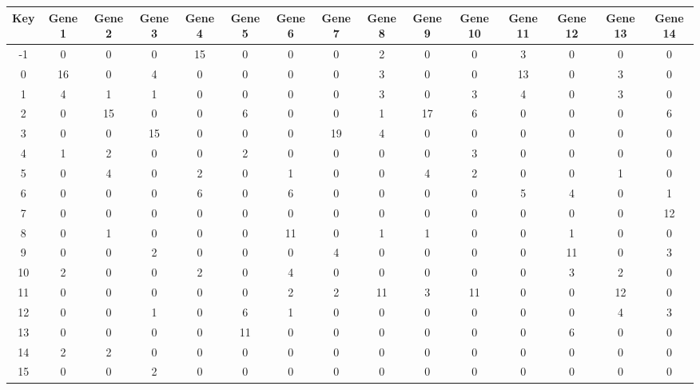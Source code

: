 \begin{tabular}{|c|c|c|c|c|c|c|c|c|c|c|c|c|c|c|}
\hline
Key & Gene 1 & Gene 2 & Gene 3 & Gene 4 & Gene 5 & Gene 6 & Gene 7 & Gene 8 & Gene 9 & Gene 10 & Gene 11 & Gene 12 & Gene 13 & Gene 14 \\
\hline
-1 & 0 & 0 & 0 & 15 & 0 & 0 & 0 & 2 & 0 & 0 & 3 & 0 & 0 & 0 \\
0 & 16 & 0 & 4 & 0 & 0 & 0 & 0 & 3 & 0 & 0 & 13 & 0 & 3 & 0 \\
1 & 4 & 1 & 1 & 0 & 0 & 0 & 0 & 3 & 0 & 3 & 4 & 0 & 3 & 0 \\
2 & 0 & 15 & 0 & 0 & 6 & 0 & 0 & 1 & 17 & 6 & 0 & 0 & 0 & 6 \\
3 & 0 & 0 & 15 & 0 & 0 & 0 & 19 & 4 & 0 & 0 & 0 & 0 & 0 & 0 \\
4 & 1 & 2 & 0 & 0 & 2 & 0 & 0 & 0 & 0 & 3 & 0 & 0 & 0 & 0 \\
5 & 0 & 4 & 0 & 2 & 0 & 1 & 0 & 0 & 4 & 2 & 0 & 0 & 1 & 0 \\
6 & 0 & 0 & 0 & 6 & 0 & 6 & 0 & 0 & 0 & 0 & 5 & 4 & 0 & 1 \\
7 & 0 & 0 & 0 & 0 & 0 & 0 & 0 & 0 & 0 & 0 & 0 & 0 & 0 & 12 \\
8 & 0 & 1 & 0 & 0 & 0 & 11 & 0 & 1 & 1 & 0 & 0 & 1 & 0 & 0 \\
9 & 0 & 0 & 2 & 0 & 0 & 0 & 4 & 0 & 0 & 0 & 0 & 11 & 0 & 3 \\
10 & 2 & 0 & 0 & 2 & 0 & 4 & 0 & 0 & 0 & 0 & 0 & 3 & 2 & 0 \\
11 & 0 & 0 & 0 & 0 & 0 & 2 & 2 & 11 & 3 & 11 & 0 & 0 & 12 & 0 \\
12 & 0 & 0 & 1 & 0 & 6 & 1 & 0 & 0 & 0 & 0 & 0 & 0 & 4 & 3 \\
13 & 0 & 0 & 0 & 0 & 11 & 0 & 0 & 0 & 0 & 0 & 0 & 6 & 0 & 0 \\
14 & 2 & 2 & 0 & 0 & 0 & 0 & 0 & 0 & 0 & 0 & 0 & 0 & 0 & 0 \\
15 & 0 & 0 & 2 & 0 & 0 & 0 & 0 & 0 & 0 & 0 & 0 & 0 & 0 & 0 \\
\hline
\end{tabular}